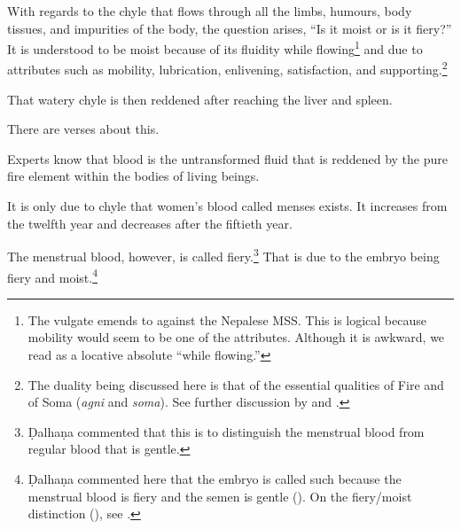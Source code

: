 \begin{translation}
With regards to the chyle that flows through all the limbs, humours, body tissues, 
and impurities of the body, the question arises, “Is it moist or is it fiery?” It is 
understood to be moist because of its fluidity while flowing\footnote{The vulgate 
emends  to  against the Nepalese MSS. This is 
logical because mobility would seem to be one of the attributes.  Although it is 
awkward, we read  as a locative absolute ``while flowing.''} and 
due to attributes such as mobility, lubrication, enlivening, satisfaction, and 
supporting.\footnote{The duality being discussed here is that of the essential 
qualities of Fire and of Soma (\emph{agni} and \emph{soma}). See further 
discussion by \citet{wuja-2004} and \citet{ange-2021}.}
    
\item [4]  
That watery chyle is then reddened after reaching the liver and spleen.

  
\item [5]
There are verses about this.

\begin{sloka}
Experts know that blood is the untransformed fluid that is reddened by the pure fire element within the bodies of living beings. %
\end{sloka}

\item [6]

\begin{sloka}
It is only due to chyle that women's blood called menses exists. It increases from the twelfth year and decreases after the fiftieth year. 
\end{sloka}

\item [7]

The menstrual blood, however, is called fiery.\footnote{Ḍalhaṇa commented that this is to distinguish the menstrual blood from regular blood that is gentle.} That is due to the embryo being fiery and moist.\footnote{Ḍalhaṇa commented here that the embryo is called such 
because the menstrual blood is fiery and the semen is gentle (). On  the fiery/moist distinction (), see \cite{wuja-2004,ange-2021}.}



\end{translation}
